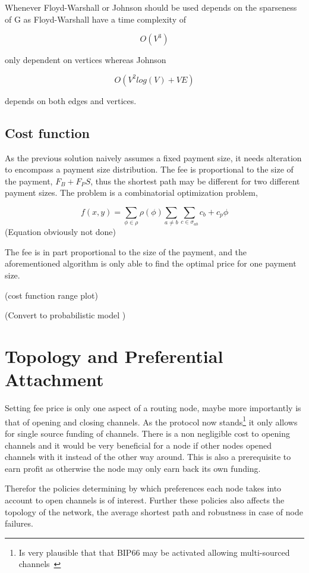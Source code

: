 Whenever Floyd-Warshall or Johnson should be used depends on the sparseness of G as Floyd-Warshall have a time complexity of

\[ O(V^3) \]

only dependent on vertices whereas Johnson

\[ O(V^2 log(V) + VE ) \]

depends on both edges and vertices. 

\subsection{Cost function}

As the previous solution naively assumes a fixed payment size, it needs alteration to encompass a payment size distribution.
The fee is proportional to the size of the payment, $F_B + F_P S$, thus the shortest path may be different for two different payment sizes. 
The problem is a combinatorial optimization problem,

\[ f(x, y) = \sum_{\phi\in \rho} \rho(\phi) \sum_{a \neq b}\sum_{c \in \sigma_{ab}} 
	 c_b + c_p\phi  
\]
(Equation obviously not done)

The fee is in part proportional to the size of the payment, and the aforementioned algorithm is only able to find the optimal price for one payment size.

(cost function range plot)

(Convert to probabilistic model )

\section{Topology and Preferential Attachment}

Setting fee price is only one aspect of a routing node, maybe more importantly is that of opening and closing channels.
As the protocol now stands\footnote{Is very plausible that that BIP66 may be activated allowing multi-sourced channels~\cite{bip:0118:sighash:noinput}} it only allows for single source funding of channels. There is a non negligible cost to opening channels and it would be very beneficial for a node if other nodes opened channels with it instead of the other way around. This is also a prerequisite to earn profit as otherwise the node may only earn back its own funding. 

Therefor the policies determining by which preferences each node takes into account to open channels is of interest. Further these policies also affects the topology of the network, the average shortest path and robustness in case of node failures.

